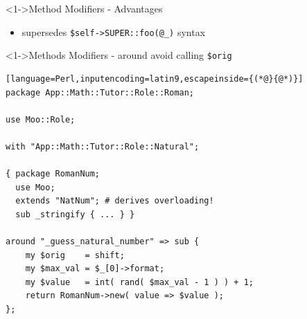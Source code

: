 \documentclass[ngerman,xcolor={table,dvipsnames},smaller,compress,hyperref={bookmarks,colorlinks}]{beamer}
\begin{document}
\begin{frame}[t,fragile]

\begin{block}<1->{Method Modifiers - Advantages}
\begin{itemize}
\item supersedes \texttt{\$self->SUPER::foo(@\_)} syntax
\end{itemize}
\end{block}

\end{frame}

\begin{frame}[t,fragile]

\begin{block}<1->{Methods Modifiers - around avoid calling \texttt{\$orig}}
\scriptsize
\begin{lstlisting}[language=Perl,inputencoding=latin9,escapeinside={(*@}{@*)}]
package App::Math::Tutor::Role::Roman;

use Moo::Role;

with "App::Math::Tutor::Role::Natural";

{ package RomanNum;
  use Moo;
  extends "NatNum"; # derives overloading!
  sub _stringify { ... } }

around "_guess_natural_number" => sub {
    my $orig    = shift;
    my $max_val = $_[0]->format;
    my $value   = int( rand( $max_val - 1 ) ) + 1;
    return RomanNum->new( value => $value );
};
\end{lstlisting}
\end{block}

\begin{itemize}
\end{itemize}

\end{frame}
\end{document}
